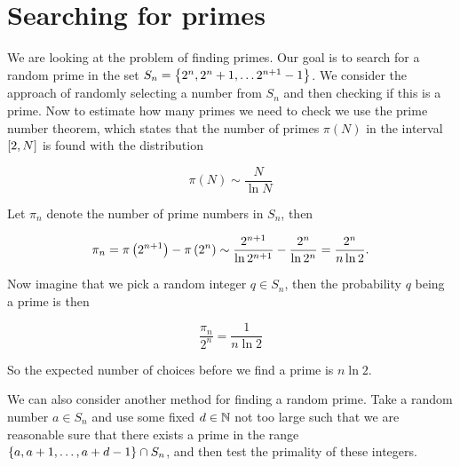 \section{Searching for primes}

We are looking at the problem of finding primes.
Our goal is to search for a random prime in the set $S_n = \left\lbrace  2^n, 2^n+1, \dots 2^{n+1}-1  \right\rbrace$.
We consider the approach of randomly selecting a number from $S_n$ and then checking if this is a prime.
Now to estimate how many primes we need to check we use the prime number theorem, which states that the number of primes $\pi (N)$ in the interval $\left[ 2, N \right]$ is found with the distribution

\begin{equation}
  \pi(N) \sim \frac{N}{\ln N}
  \label{eq:pmt}
\end{equation}

Let $\pi_n$ denote the number of prime numbers in $S_n$, then

\begin{equation}
  \pi_n = \pi\left(  2^{n+1}  \right) - \pi\left(  2^{n}  \right) \sim \frac{2^{n+1}}{\ln 2^{n+1}} - \frac{2^{n}}{\ln 2^{n}}
  = \frac{ 2^{n} }{n \ln 2}.
  \label{eq:primes-in-sn}
\end{equation}

Now imagine that we pick a random integer $q \in S_n$, then the probability $q$ being a prime is then

\begin{equation}
  \frac{\pi_n}{2^n} = \frac{1}{n\ln 2}
  \label{eq:probability-of-prime}
\end{equation}

So the expected number of choices before we find a prime is $n \ln 2$.

We can also consider another method for finding a random prime.
Take a random number $a \in S_n$ and use some fixed $d \in \mathbb{N}$ not too large such that we are reasonable sure that there exists a prime in the range $\left\lbrace  a, a+1, \dots, a+d-1  \right\rbrace \cap S_n$, and then test the primality of these integers.


